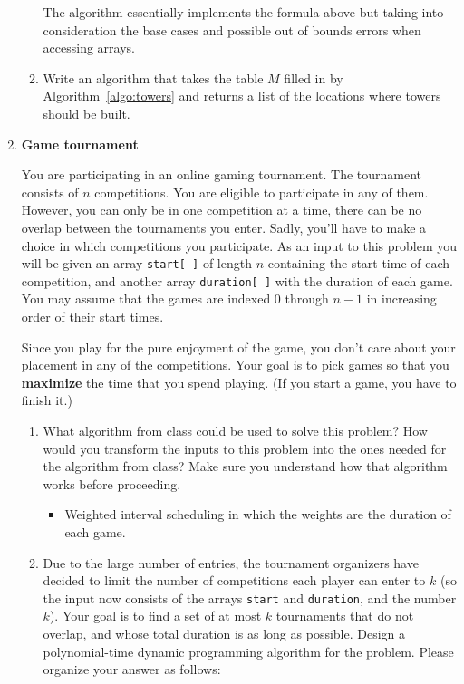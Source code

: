 \documentclass[11pt]{article}
\begin{document}
\begin{enumerate}
\begin{enumerate}
    \color{teal}
    The algorithm essentially implements the formula above but taking into 
    consideration the base cases and possible out of bounds errors when 
    accessing arrays.
    \color{black}
      
 
    

    \item Write an algorithm that takes the table $M$ filled in by Algorithm~\ref{algo:towers} and returns a list of the locations where towers should be built.     

\end{enumerate}

\item {\bf Game tournament}

You are participating in an online gaming tournament. The tournament consists of $n$  competitions. You are eligible to participate in any of them. However, you can only be in one competition at a time, there can be no overlap between the tournaments you enter. Sadly, you'll have to make a choice in which competitions you participate. As an input to this problem you will be given an array \texttt{start[\ ]} of length $n$  containing the start time of each competition, and another array \texttt{duration[\ ]} with the duration of each game. You may assume that the games are indexed $0$ through $n-1$ in increasing order of their start times. 

Since you play for the pure enjoyment of the game, you don't care about your placement in any of the competitions.  Your goal is to pick games so that you {\bf maximize} the time that you spend playing. (If you start a game, you have to finish it.) 
\begin{enumerate}
    \item What algorithm from class could be used to solve this problem? How would you transform the inputs to this problem into the ones needed for the algorithm from class? Make sure you understand how that algorithm works before proceeding. 
      
        \begin{itemize}
            \color{teal}
            \item Weighted interval scheduling in which the weights are the 
                duration of each game.
        \end{itemize}
\item\label{part:2} Due to the large number of entries, the tournament organizers have decided to limit the number of competitions each player can enter to $k$ (so the input now consists of the arrays \texttt{start} and \texttt{duration}, and the number $k$). Your goal is to find a set of at most $k$ tournaments that do not overlap, and whose total duration is as long as possible. Design a polynomial-time dynamic programming algorithm for the problem. Please organize your answer as follows: 


\end{enumerate}
\end{enumerate}
\end{document}
